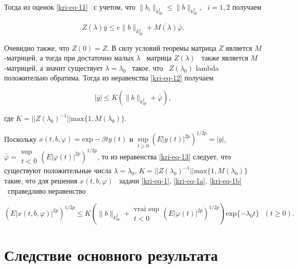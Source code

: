 Тогда из оценок \eqref{kri-eq-11} \ с учетом, что  $\|b_i\|_{k_{2p}^1}\le \|b\|_{k_{2p}^2},\text{  }i=1,2$ получаем

\begin{equation}\label{kri-eq-12}
	Z(\lambda
	)\overline y\le e\|b\|_{k_{2p}^2}+\overline{M(\lambda )}\overline{\overline{\varphi
	}}.
\end{equation}

Очевидно также, что  $Z(0)=Z$. В силу условий теоремы матрица  $Z$ является  $M$-\linebreak матрицей, а тогда при достаточно
малых  $\lambda $ \ матрица  $Z(\lambda )$ \ также является  $M${}-матрицей, а значит существует  $\lambda =\lambda _0$
\ такое, что \  $Z(\lambda _0)$ lambda положительно обратима. Тогда из неравенства \eqref{kri-eq-12} получаем

\begin{equation}\label{kri-eq-13}
	|\overline y|\le K(\|b\|_{k_{2p}^2}+\overline{\overline{\varphi
	}}),
\end{equation}

где  $K=||Z(\lambda _0)^{-1}||\text{max}\{1,M(\lambda _0)\}.$

Поскольку  $x(t,b,\varphi )=\text{exp}-\beta ty(t)$  и   $\underset{t\ge
0}\sup\left(E|y(t)|^{2p}\right)^{1/2p}=|\overline y|$,  $\overline{\overline{\varphi
}}=\begin{matrix}\sup\\t<0\end{matrix}\left(E|\varphi (t)|^{2p}\right)^{1/2p}$, то из неравенства \eqref{kri-eq-13} следует,
что существуют положительные числа  $\lambda =\lambda _0$, \linebreak  $K=||Z(\lambda _0)^{-1}||\text{max}\{1,M(\lambda _0)\}$
такие, что для решения  $x(t,b,\varphi )$ \ задачи \eqref{kri-eq-1}, \eqref{kri-eq-1a}, \eqref{kri-eq-1b} \ справедливо неравенство

\begin{equation*}
(E|x(t,b,\varphi )|^{2p})^{1/2p}\le
K\left(\|b\|_{k_{2p}^2}+\begin{matrix}\text{vrai sup}\\t<0\end{matrix}(E|\varphi
(t)|^{2p})^{1/2p}\right)\text{exp}\{-\lambda _0 t\}\text{  }(t\ge 0).
\end{equation*}

\section{Следствие основного результата}

